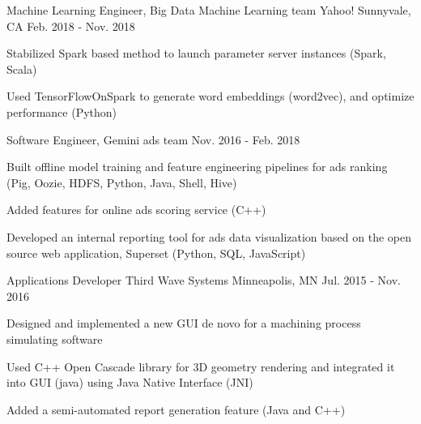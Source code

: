 \begin{cventries}
  \cventry
    {Machine Learning Engineer, Big Data Machine Learning team} %
    {Yahoo!} %
    {Sunnyvale, CA} %
    {Feb. 2018 - Nov. 2018} %
    {
      \begin{cvitems} %
        \item {Stabilized Spark based method to launch parameter server instances (Spark, Scala)}
        \item {Used TensorFlowOnSpark to generate word embeddings (word2vec), and optimize performance (Python)}
      \end{cvitems}
    }

  \cventry
    {Software Engineer, Gemini ads team} %
    {} %
    {} %
    {Nov. 2016 - Feb. 2018} %
    {
      \begin{cvitems} %
        \item {Built offline model training and feature engineering pipelines for ads ranking (Pig, Oozie, HDFS, Python, Java, Shell, Hive)}
        \item {Added features for online ads scoring service (C++)}
        \item {Developed an internal reporting tool for ads data visualization based on the open source web application,
Superset (Python, SQL, JavaScript)}
      \end{cvitems}
    }
    
  \cventry
    {Applications Developer} %
    {Third Wave Systems} %
    {Minneapolis, MN} %
    {Jul. 2015 - Nov. 2016} %
    {
      \begin{cvitems} %
        \item {Designed and implemented a new GUI de novo for a machining process simulating software}
        \item {Used C++ Open Cascade library for 3D geometry rendering and integrated it into GUI (java) using Java Native Interface (JNI)}
        \item {Added a semi-automated report generation feature (Java and C++)}
      \end{cvitems}
    }


\end{cventries}
